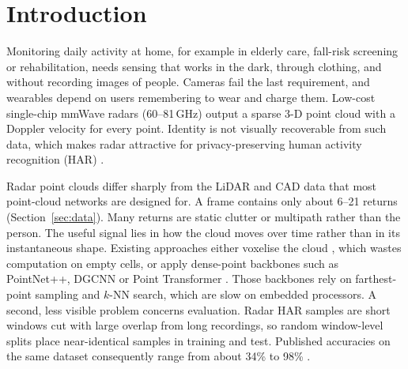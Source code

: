 \section{Introduction}
Monitoring daily activity at home, for example in elderly care, fall-risk
screening or rehabilitation, needs sensing that works in the dark, through
clothing, and without recording images of people. Cameras fail the last
requirement, and wearables depend on users remembering to wear and charge them.
Low-cost single-chip mmWave radars (60--81\,GHz) output a sparse 3-D point cloud
with a Doppler velocity for every point. Identity is not visually recoverable
from such data, which makes radar attractive for privacy-preserving human
activity recognition (HAR) \cite{singh2019radhar,ullmann2023survey}.

Radar point clouds differ sharply from the LiDAR and CAD data that most
point-cloud networks are designed for. A frame contains only about 6--21 returns
(Section~\ref{sec:data}). Many returns are static clutter or multipath rather than
the person. The useful signal lies in how the cloud moves over time rather than
in its instantaneous shape. Existing approaches either voxelise the
cloud \cite{singh2019radhar}, which wastes computation on empty cells, or apply
dense-point backbones such as PointNet++, DGCNN or Point Transformer
\cite{qi2017pointnet2,wang2019dgcnn,zhao2021pt}. Those backbones rely on
farthest-point sampling and $k$-NN search, which are slow on embedded processors.
A second, less visible problem concerns evaluation. Radar HAR samples are short
windows cut with large overlap from long recordings, so random window-level
splits place near-identical samples in training and test. Published accuracies
on the same dataset consequently range from about 34\% to 98\%
\cite{cui2023milipoint,zakka2025makgcn}.

